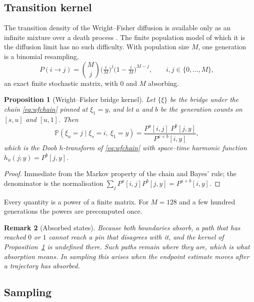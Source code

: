 \documentclass[11pt,a4paper]{article}
\newtheorem{prop}{Proposition}
\newtheorem{rem}[prop]{Remark}
\def\P{\mathbb{P}}
\def\xib{\xi}
\begin{document}
\subsection{Transition kernel}

The transition density of the Wright--Fisher diffusion is available only as an
infinite mixture over a death process \cite{griffiths1979,jenkins2017}. The
finite population model of which it is the diffusion limit has no such
difficulty. With population size $M$, one generation is a binomial resampling,
\begin{equation}
\label{eq:wfchain}
P(i\to j)=\binom{M}{j}\Big(\tfrac{i}{M}\Big)^{j}\Big(1-\tfrac{i}{M}\Big)^{M-j},
\qquad i,j\in\{0,\dots,M\},
\end{equation}
an exact finite stochastic matrix, with $0$ and $M$ absorbing.

\begin{prop}[Wright--Fisher bridge kernel]
\label{prop:wf}
Let $\{\xib\}$ be the bridge under the chain \eqref{eq:wfchain} pinned at
$\xib_1=y$, and let $a$ and $b$ be the generation counts on $[s,u]$ and $[u,1]$.
Then
\begin{equation}
\P(\xib_u=j\mid\xib_s=i,\ \xib_1=y)
=\frac{P^{a}[i,j]\;P^{b}[j,y]}{P^{a+b}[i,y]},
\end{equation}
which is the Doob $h$-transform of \eqref{eq:wfchain} with space--time harmonic
function $h_u(j;y)=P^{b}[j,y]$.
\end{prop}

\begin{proof}
Immediate from the Markov property of the chain and Bayes' rule; the denominator
is the normalisation $\sum_j P^{a}[i,j]P^{b}[j,y]=P^{a+b}[i,y]$.
\end{proof}

Every quantity is a power of a finite matrix. For $M=128$ and a few hundred
generations the powers are precomputed once.

\begin{rem}[Absorbed states]
Because both boundaries absorb, a path that has reached $0$ or $1$ cannot reach
a pin that disagrees with it, and the kernel of Proposition~\ref{prop:wf} is
undefined there. Such paths remain where they are, which is what absorption
means. In sampling this arises when the endpoint estimate moves after a
trajectory has absorbed.
\end{rem}

\subsection{Sampling}
\end{document}
